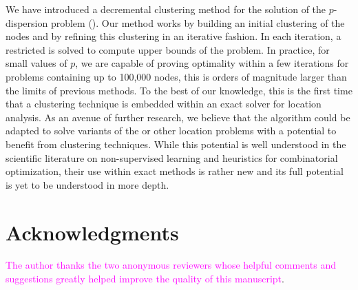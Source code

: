 \documentclass[ijoo,nonblindrev]{informs-ijoo}
\begin{document}
We have introduced a decremental clustering method for the solution of the $p$-dispersion problem (\pDP{}). Our method works by building an initial clustering of the nodes and by refining this clustering in an iterative fashion. In each iteration, a restricted \pDP{} is solved to compute upper bounds of the problem. In practice, for small values of $p$, we are capable of proving optimality within a few iterations for problems containing up to 100,000 nodes, this is orders of magnitude larger than the limits of previous methods. To the best of our knowledge, this is the first time that a clustering technique is embedded within an exact solver for location analysis. As an avenue of further research, we believe that the algorithm could be adapted to solve variants of the \pDP{} or other location problems with a potential to benefit from clustering techniques. While this potential is well understood in the scientific literature on non-supervised learning and heuristics for combinatorial optimization, their use within exact methods is rather new and its full potential is yet to be understood in more depth.

\section*{Acknowledgments}

\textcolor{magenta}{The author thanks the two anonymous reviewers whose helpful comments and suggestions greatly helped improve the quality of this manuscript}.%



\end{document}
